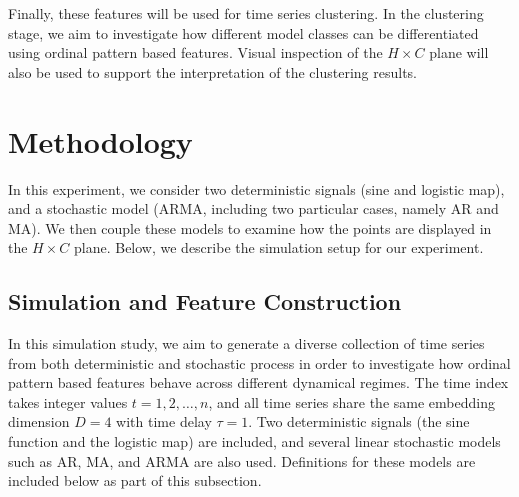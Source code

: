 \documentclass[12pt,a4paper]{article}
\begin{document}
Finally, these features will be used for time series clustering. 
In the clustering stage, we aim to investigate how different model classes can be differentiated using ordinal pattern based features. 
Visual inspection of the $H \times C$ plane will also be used to support the interpretation of the clustering results. 

	
\section{Methodology}

In this experiment, we consider two deterministic signals (sine and logistic map), and a stochastic model  (ARMA, including two particular cases, namely AR and MA).  
We then couple these models to examine how the points are displayed in the $H \times C$ plane. 
Below, we describe the simulation setup for our experiment.

\subsection{Simulation and Feature Construction}

In this simulation study, we aim to generate a diverse collection of time series from both deterministic and stochastic process in order to investigate how ordinal pattern based features behave across different dynamical regimes.  
The time index takes integer values $t = 1,2,\ldots,n$, and all time series share the same embedding dimension $D = 4$ with time delay $\tau = 1$.  
Two deterministic signals (the sine function and the logistic map) are included, and several linear stochastic models such as $\mathrm{AR}$, $\mathrm{MA}$, and $\mathrm{ARMA}$ are also used.  
Definitions for these models are included below as part of this subsection.


\end{document}
